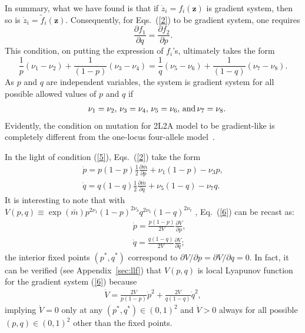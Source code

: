\documentclass[
 pre,
 aps,
 a4paper,
 english,
 showkeys,
 reprint,
 twocolumn,
 superscriptaddress
]{revtex4}
\begin{document}
In summary, what we have found is that if $\dot{z}_i={f}_i({\boldsymbol{z}})$ is gradient system, then so is $\dot{z}_i=\tilde{f}_i({\boldsymbol{z}})$. Consequently, for Eqs.~(\ref{2}) to be gradient system, one requires
\begin{equation}\label{3}
\frac{\partial f_1}{\partial q}=\frac{\partial f_2}{\partial p}.
\end{equation}
This condition, on putting the expression of $f_i$'s, ultimately takes the form
\begin{equation}\label{4}
\frac{1}{p}(\nu_1-\nu_2)+\frac{1}{(1-p)}(\nu_3-\nu_4)=\frac{1}{q}(\nu_5-\nu_6)+\frac{1}{(1-q)}(\nu_7-\nu_8).
\end{equation}
As $p$ and $q$ are independent variables, the system is gradient system for all possible allowed values of $p$ and $q$ if
	\begin{eqnarray}\label{5}
	&& \nu_1=\nu_2,\,\nu_3=\nu_4,\, \nu_5=\nu_6,\,{\rm and}\,\nu_7=\nu_8.
	\end{eqnarray}
Evidently, the condition on mutation for 2L2A model  to be gradient-like is completely different from the one-locus four-allele model~\cite{hofbauer1998book}.

In the light of condition (\ref{5}), Eqs.~(\ref{2}) take the form
\begin{subequations}
\label{6}
\begin{eqnarray}
\dot{p}=p(1-p)\frac{1}{2}\frac{\partial \bar{m}}{\partial p} +\nu_1(1-p)-\nu_3 p,\\
\dot{q}=q(1-q)\frac{1}{2}\frac{\partial \bar{m}}{\partial q} +\nu_5(1-q)-\nu_7 q.
\end{eqnarray}
\end{subequations}
It is interesting to note that with  $V(p,q)\equiv\exp (\bar{m})p^{2\nu_1}(1-p)^{2\nu_3}q^{2\nu_5}(1-q)^{2\nu_7}$ , Eq.~(\ref{6}) can be recast as: 
\begin{subequations}\label{eq:7}
	\begin{eqnarray}
	&& \dot{p}=\frac{p(1-p)}{2V}\frac{\partial V}{\partial p},\\&&\dot{q}=\frac{q(1-q)}{2V}\frac{\partial V}{\partial q};
	\end{eqnarray}
\end{subequations}
the interior fixed points $(p^*,q^*)$ correspond to  ${\partial V}/{\partial p}={\partial V}/{\partial q}=0$. In fact, it can be verified (see Appendix~\ref{sec:llf}) that $V(p,q)$ is local Lyapunov function for the gradient system (\ref{6}) because
\begin{equation}\label{9}
\begin{aligned}
\dot{V}=\frac{2V}{p(1-p)}\dot{p}^2+\frac{2V}{q(1-q)}\dot{q}^2,
\end{aligned}
\end{equation}
implying $\dot{V}= 0$ only at any $(p^*,q^*)\in(0,1)^2$ and  $\dot{V} > 0$ always for all possible $(p,q)\in(0,1)^2$ other than the fixed points.
\end{document}
